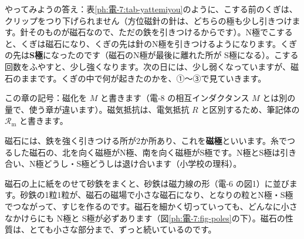 \noindent やってみようの答え：表\ref{ph:電-7:tab-yattemiyou}のように、こする前のくぎは、クリップをつり下げられません（方位磁針の針は、どちらの極も少し引きつけます。針そのものが磁石なので、ただの鉄を引きつけるからです）。N極でこすると、くぎは磁石になり、くぎの先は針のN極を引きつけるようになります。くぎの先は\textbf{S極}になったのです（磁石のN極が最後に離れた所が S極になる）。こする回数をふやすと、少し強くなります。次の日には、少し弱くなっていますが、磁石のままです。くぎの中で何が起きたのかを、①〜③で見ていきます。

\begin{omoidasou}
\end{omoidasou}

\noindent この章の記号：磁化を $M$ と書きます（電-8 の相互インダクタンス $M$ とは別の量で、使う章が違います）。磁気抵抗は、電気抵抗 $R$ と区別するため、筆記体の $\mathcal R_{\mathrm m}$ と書きます。



\label{ph:電-7:sec1}
磁石には、鉄を強く引きつける所が2か所あり、これを\textbf{磁極}といいます。糸でつるした磁石の、北を向く磁極がN極、南を向く磁極がS極です。N極とS極は引き合い、N極どうし・S極どうしは退け合います（小学校の理科）。

磁石の上に紙をのせて砂鉄をまくと、砂鉄は磁力線の形（電-6 の図1）に並びます。砂鉄の1粒1粒が、磁石の磁場で小さな磁石になり、となりの粒とN極・S極でつながって、すじを作るのです。磁石を細かく切っていっても、どんなに小さなかけらにも N極と S極が必ずあります（図\ref{ph:電-7:fig-poles}の下）。磁石の性質は、とても小さな部分まで、ずっと続いているのです。


